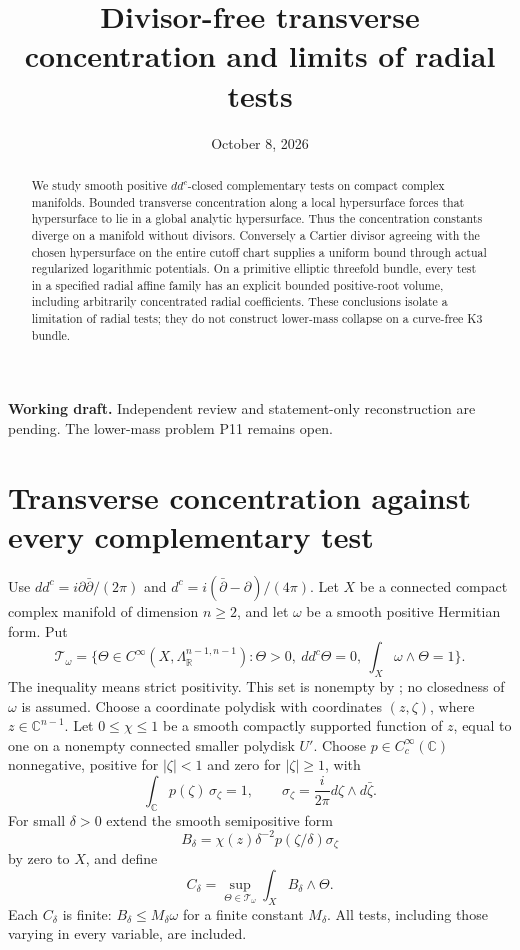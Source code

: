 \documentclass[11pt]{article}
\title{Divisor-free transverse concentration and limits of radial tests}
\author{}\date{October 8, 2026}
\theoremstyle{remark}\newtheorem{remark}{Remark}
\newcommand{\ddc}{dd^c}
\newcommand{\dc}{d^c}
\begin{document}
\maketitle
\noindent\textbf{Working draft.} Independent review and statement-only
reconstruction are pending. The lower-mass problem P11 remains open.
\begin{abstract}
We study smooth positive $\ddc$-closed complementary tests on compact
complex manifolds. Bounded transverse concentration along a local
hypersurface forces that hypersurface to lie in a global analytic
hypersurface. Thus the concentration constants diverge on a manifold
without divisors. Conversely a Cartier divisor agreeing with the chosen
hypersurface on the entire cutoff chart supplies a uniform bound through
actual regularized logarithmic potentials. On a primitive elliptic
threefold bundle, every test in a specified radial affine family has an
explicit bounded positive-root volume, including arbitrarily concentrated
radial coefficients. These conclusions isolate a limitation of radial
tests; they do not construct lower-mass collapse on a curve-free K3 bundle.
\end{abstract}

\section{Transverse concentration against every complementary test}
Use $\ddc=i\partial\bar\partial/(2\pi)$ and
$\dc=i(\bar\partial-\partial)/(4\pi)$. Let $X$ be a connected compact
complex manifold of dimension $n\geq2$, and let $\omega$ be a smooth
positive Hermitian form. Put
\[
 \mathcal T_\omega=\{\Theta\in C^\infty(X,\Lambda^{n-1,n-1}_{\mathbb R}):
 \Theta>0,\ \ddc\Theta=0,\ \int_X\omega\wedge\Theta=1\}.
\]
The inequality means strict positivity. This set is nonempty by
\cite[Proposition 1.3]{Lamari}; no closedness of $\omega$ is assumed.
Choose a coordinate polydisk with coordinates $(z,\zeta)$, where
$z\in\mathbb C^{n-1}$. Let $0\leq\chi\leq1$ be a smooth compactly
supported function of $z$, equal to one on a nonempty connected smaller
polydisk $U'$. Choose $p\in C_c^\infty(\mathbb C)$ nonnegative, positive for
$|\zeta|<1$ and zero for $|\zeta|\geq1$, with
\[
 \int_{\mathbb C}p(\zeta)\,\sigma_\zeta=1,\qquad
 \sigma_\zeta=\frac{i}{2\pi}d\zeta\wedge d\bar\zeta.
\]
For small $\delta>0$ extend the smooth semipositive form
\[
 B_\delta=\chi(z)\delta^{-2}p(\zeta/\delta)\sigma_\zeta
\]
by zero to $X$, and define
\[
 C_\delta=\sup_{\Theta\in\mathcal T_\omega}
                    \int_X B_\delta\wedge\Theta.
\]
Each $C_\delta$ is finite: $B_\delta\leq M_\delta\omega$ for a finite
constant $M_\delta$. All tests, including those varying in every variable,
are included.
\end{document}
